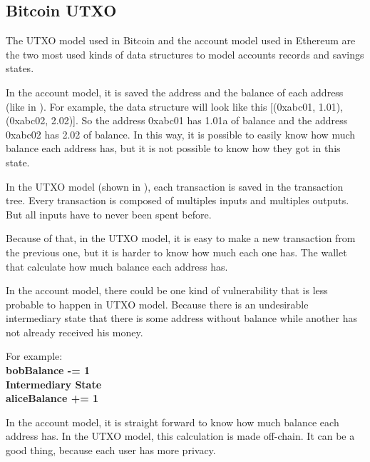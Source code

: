 \subsection{Bitcoin UTXO}

The UTXO model used in Bitcoin and the account model used in Ethereum are the two most used kinds
of data structures to model accounts records and savings states.


In the account model, it is saved the address and the balance of each address
(like in ).
For example, the data structure will look like this [(0xabc01, 1.01), (0xabc02, 2.02)].
So the address 0xabc01 has 1.01a of balance and the address 0xabc02 has 2.02 of balance.
In this way, it is possible to easily know how much balance each address has,
but it is not possible to know how they got in this state.


In the UTXO model (shown in ), each transaction is saved in the transaction tree.
Every transaction is composed of multiples inputs and multiples outputs.
But all inputs have to never been spent before.

Because of that, in the UTXO model, it is easy to make a new transaction from the previous one,
but it is harder to know how much each one has.
The wallet that calculate how much balance each address has.

In the account model, there could be one kind of vulnerability that is less probable to happen in UTXO
model.
Because there is an undesirable intermediary state that there is some address without balance while
another has not already received his money.

For example: \\
\textbf{
bobBalance -= 1 \\
Intermediary State \\
aliceBalance += 1
}

In the account model, it is straight forward to know how much balance each address has.
In the UTXO model, this calculation is made off-chain. It can be a good thing,
because each user has more privacy.

